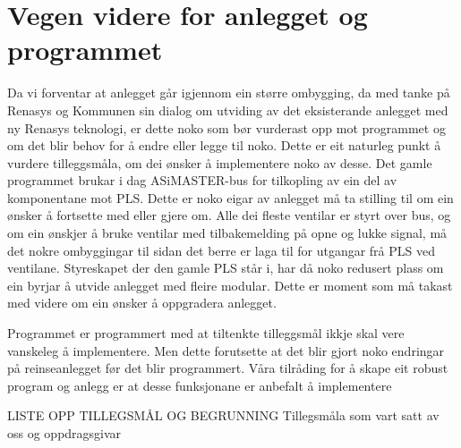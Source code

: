 \section{Vegen videre for anlegget og programmet}
\thispagestyle{fancy}


Da vi forventar at anlegget går igjennom ein større ombygging, da med tanke på Renasys og Kommunen sin dialog om utviding av det eksisterande anlegget med ny Renasys teknologi, er dette noko som bør vurderast opp mot programmet og om det blir behov for å endre eller legge til noko. 
Dette er eit naturleg punkt å vurdere tilleggsmåla, om dei ønsker å implementere noko av desse.
Det gamle programmet brukar i dag ASiMASTER-bus for tilkopling av ein del av komponentane mot PLS. 
Dette er noko eigar av anlegget må ta stilling til om ein ønsker å fortsette med eller gjere om. Alle dei fleste ventilar er styrt over bus, og om ein ønskjer å bruke ventilar med tilbakemelding på opne og lukke signal, må det nokre ombyggingar til sidan det berre er laga til for utgangar frå PLS ved ventilane.
Styreskapet der den gamle PLS står i, har då noko redusert plass om ein byrjar å utvide anlegget med fleire modular. 
Dette er moment som må takast med videre om ein ønsker å oppgradera anlegget. 

Programmet er programmert med at tiltenkte tilleggsmål ikkje skal vere vanskeleg å implementere. 
Men dette forutsette at det blir gjort noko endringar på reinseanlegget før det blir programmert. 
Våra tilråding for å skape eit robust program og anlegg er at desse funksjonane er anbefalt å implementere

LISTE OPP TILLEGSMÅL OG BEGRUNNING
Tillegsmåla som vart satt av oss og oppdragsgivar



\newpage

